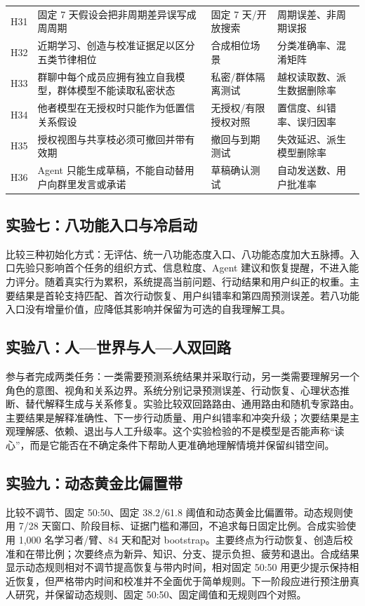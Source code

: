 \documentclass[UTF8,a4paper,11pt]{ctexart}
\begin{document}
\begin{center}
\begin{longtable}{@{}p{1.4cm}p{4.5cm}p{5.2cm}p{3.4cm}@{}}
H31 & 固定 7 天假设会把非周期差异误写成周周期 & 固定 7 天/开放搜索 & 周期误差、非周期误报 \\
H32 & 近期学习、创造与校准证据足以区分五类节律相位 & 合成相位场景 & 分类准确率、混淆矩阵 \\
H33 & 群聊中每个成员应拥有独立自我模型，群体模型不能读取私密状态 & 私密/群体隔离测试 & 越权读取数、派生数据删除率 \\
H34 & 他者模型在无授权时只能作为低置信关系假设 & 无授权/有限授权对照 & 置信度、纠错率、误归因率 \\
H35 & 授权视图与共享枝必须可撤回并带有效期 & 撤回与到期测试 & 失效延迟、派生模型删除率 \\
H36 & Agent 只能生成草稿，不能自动替用户向群里发言或承诺 & 草稿确认测试 & 自动发送数、用户批准率 \\
\bottomrule
\end{longtable}
\end{center}


\subsection{实验七：八功能入口与冷启动}

比较三种初始化方式：无评估、统一八功能态度入口、八功能态度加大五脉搏。入口先验只影响首个任务的组织方式、信息粒度、Agent 建议和恢复提醒，不进入能力评分。随着真实行为累积，系统提高当前问题、行动结果和用户纠正的权重。主要结果是首轮支持匹配、首次行动恢复、用户纠错率和第四周预测误差。若八功能入口没有增量价值，应降低其影响并保留为可选的自我理解工具。

\subsection{实验八：人—世界与人—人双回路}

参与者完成两类任务：一类需要预测系统结果并采取行动，另一类需要理解另一个角色的意图、视角和关系边界。系统分别记录预测误差、行动恢复、心理状态推断、替代解释生成与关系修复。实验比较双回路路由、通用路由和随机专家路由。主要结果是解释准确性、下一步行动质量、用户纠错率和冲突升级；次要结果是主观理解感、依赖、退出与人工升级率。这个实验检验的不是模型是否能声称“读心”，而是它能否在不确定条件下帮助人更准确地理解情境并保留纠错空间。

\subsection{实验九：动态黄金比偏置带}

比较不调节、固定 50:50、固定 38.2/61.8 阈值和动态黄金比偏置带。动态规则使用 7/28 天窗口、阶段目标、证据门槛和滞回，不追求每日固定比例。合成实验使用 1,000 名学习者/臂、84 天和配对 bootstrap。主要终点为行动恢复、创造后校准和在带比例；次要终点为新异、知识、分支、提示负担、疲劳和退出。合成结果显示动态规则相对不调节提高恢复与带内时间，相对固定 50:50 用更少提示保持相近恢复，但严格带内时间和校准并不全面优于简单规则。下一阶段应进行预注册真人研究，并保留动态规则、固定 50:50、固定阈值和无规则四个对照。
\end{document}
